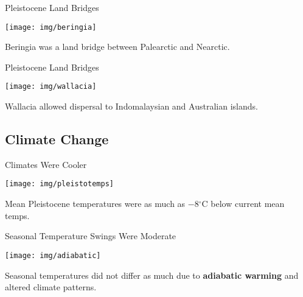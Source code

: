 \documentclass[xcolor=svgnames]{beamer}
\begin{document}
\begin{frame}{Pleistocene Land Bridges}
		\begin{center}
			\texttt{[image: img/beringia]}
			\begin{block}{}
				Beringia was a land bridge between Palearctic and Nearctic.
			\end{block}
		\end{center}
\end{frame}

\begin{frame}{Pleistocene Land Bridges}
		\begin{center}
			\texttt{[image: img/wallacia]}
			\begin{block}{}
				Wallacia allowed dispersal to Indomalaysian and Australian islands.
			\end{block}
		\end{center}
\end{frame}

\subsection{Climate Change}

\begin{frame}{Climates Were Cooler}
		\begin{center}
			\texttt{[image: img/pleistotemps]}
			\begin{block}{}
				Mean Pleistocene temperatures were as much as $-$8$^{\circ}$C below current mean temps.
			\end{block}
		\end{center}
\end{frame}

\begin{frame}{Seasonal Temperature Swings Were Moderate}
		\begin{center}
			\texttt{[image: img/adiabatic]}
			\begin{block}{}
				Seasonal temperatures did not differ as much due to \textcolor{myBlue}{\textbf{adiabatic warming}} and altered climate patterns.
			\end{block}
		\end{center}
\end{frame}
\end{document}
